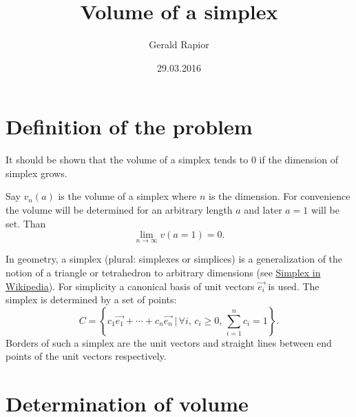 \documentclass[11pt,paper=a4,oneside,ngerman,english,parskip=half]{scrartcl}
\title{Volume of a simplex}
\author{Gerald Rapior}
\date{29.03.2016}
\begin{document}
\maketitle

\section{Definition of the problem}
\label{sec:DefProblem}

It should be shown that the volume of a simplex tends to 0 if the dimension of simplex grows.

Say $v_n(a)$ is the volume of a simplex where $n$ is the dimension. For convenience the volume will be determined for an arbitrary length $a$ and later $a = 1$ will be set. Than
\begin{equation}
\lim\limits_{n\rightarrow\infty} v(a = 1) = 0.
\end{equation}

In geometry, a simplex (plural: simplexes or simplices) is a generalization of the notion of a triangle or tetrahedron to arbitrary dimensions (see \href{https://en.wikipedia.org/wiki/Simplex}{Simplex in Wikipedia}).
For simplicity a canonical basis of unit vectors $\vec{e_i}$ is used. The simplex is determined by a set of points:
\begin{equation}
C = \left\{ c_1 \vec{e_1} + \cdots + c_n \vec{e_n}\,| \,\forall i,\,c_i\geq 0,\, \sum_{i=1}^{n} c_i = 1 \right\}.
\end{equation}
Borders of such a simplex are the unit vectors and straight lines between end points of the unit vectors respectively.


\section{Determination of volume}
\label{sec:Volume}
\end{document}
